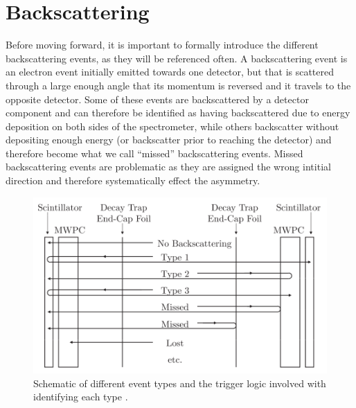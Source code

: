 \section{Backscattering} \label{sec:backscattering}
Before moving forward, it is important to formally introduce the different
backscattering events, as they will be referenced often. A backscattering
event is an electron event initially emitted towards one detector, but that
is scattered through a large enough angle that its momentum is reversed and
it travels to the opposite detector. Some of these events are backscattered
by a detector component and can therefore be identified as having backscattered
due to energy deposition on both sides of the spectrometer,
while others backscatter without depositing enough energy (or backscatter prior
to reaching the detector) and therefore become what we call ``missed''
backscattering events. Missed backscattering events are problematic as they
are assigned the wrong intitial direction and therefore systematically effect
the asymmetry.

\begin{figure}[h]
\centering
\includegraphics[scale=.4]{3-UCNAAnalysis/backscatterSchematic.png}
\caption{Schematic of different event types and the trigger logic involved with identifying
  each type \cite{plaster2012}.}
\label{fig:backscatterSchematic}
\end{figure}

